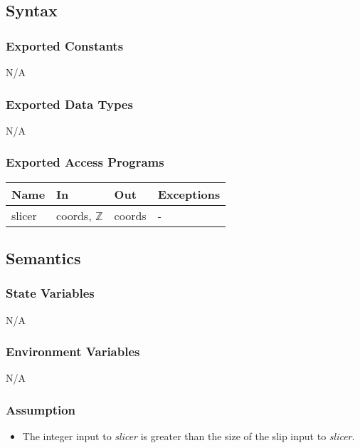 \documentclass[12pt, titlepage]{article}
\begin{document}
\subsection{Syntax}

\subsubsection{Exported Constants}
N/A

\subsubsection{Exported Data Types}
N/A

\subsubsection{Exported Access Programs}

\begin{center}
	\renewcommand*{\arraystretch}{1.5}
	\begin{tabular} {p{}  p{}  p{} 
			p{} } \hline 
		\textbf{Name} & \textbf{In} & \textbf{Out} & \textbf{Exceptions} \\ 
		\hline
		slicer & coords, $\mathbb{Z}$ & coords & - \\ \hline
		
	\end{tabular}
\end{center}

\subsection{Semantics}

\subsubsection{State Variables}
N/A

\subsubsection{Environment Variables}
N/A

\subsubsection{Assumption}
\begin{itemize}
	\item The integer input to \textit{slicer} is greater than the size of the 
	slip input to \textit{slicer}.
\end{itemize}
\end{document}
